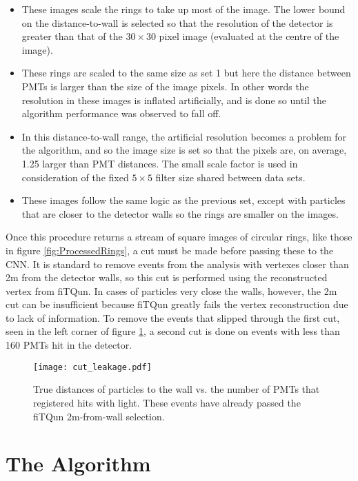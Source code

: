 \documentclass[twoside,twocolumn]{article}
\begin{document}
\begin{itemize}
    \item[Set 1:]{
        These images scale the rings to take up most of the image. The lower bound on the distance-to-wall is selected so that the resolution of the detector is greater than that of the $30\times 30$ pixel image (evaluated at the centre of the image).
    }
    \item[Set 2:]{
        These rings are scaled to the same size as set 1 but here the distance between PMTs is larger than the size of the image pixels. In other words the resolution in these images is inflated artificially, and is done so until the algorithm performance was observed to fall off.
    }
    \item[Set 3:]{
        In this distance-to-wall range, the artificial resolution becomes a problem for the algorithm, and so the image size is set so that the pixels are, on average, 1.25 larger than PMT distances. The small scale factor is used in consideration of the fixed $5\times 5$ filter size shared between data sets.
    }
    \item[Set 4:]{
        These images follow the same logic as the previous set, except with particles that are closer to the detector walls so the rings are smaller on the images.
    }
\end{itemize}

Once this procedure returns a stream of square images of circular rings, like those in figure \ref{fig:ProcessedRings}, a cut must be made before passing these to the CNN. It is standard to remove events from the analysis with vertexes closer than 2m from the detector walls, so this cut is performed using the reconstructed vertex from fiTQun. In cases of particles very close the walls, however, the 2m cut can be insufficient because fiTQun greatly fails the vertex reconstruction due to lack of information. To remove the events that slipped through the first cut, seen in the left corner of figure \ref{fig:cut_leakage}, a second cut is done on events with less than 160 PMTs hit in the detector. 

\begin{figure}[ht]
    \centering
    \texttt{[image: cut\_leakage.pdf]}
    \caption{True distances of particles to the wall vs. the number of PMTs that registered hits with light. These events have already passed the fiTQun 2m-from-wall selection.}
    \label{fig:cut_leakage}
\end{figure}

\section{The Algorithm}
\end{document}
